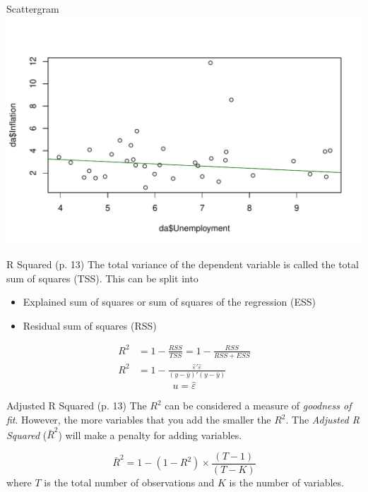 \documentclass[14pt,xcolor=pdftex,dvipsnames,table]{beamer}\usepackage[]{graphicx}\usepackage[]{color}
\makeatletter
\def\maxwidth{ %
  \ifdim\Gin@nat@width>\linewidth
    \linewidth
  \else
    \Gin@nat@width
  \fi
}
\newenvironment{knitrout}{}{} %
\makeatother
\begin{document}
\begin{frame}{Scattergram}
\begin{knitrout}
\color{fgcolor}
\includegraphics[width=\maxwidth]{figure/scatter-1} 

\end{knitrout}
\end{frame}


\begin{frame}{R Squared (p. 13)}
The total variance of the dependent variable is called the total sum of squares (TSS).  This can be split into 
\begin{itemize}[<+-| alert@+>]
\item Explained sum of squares or sum of squares of the regression (ESS)
\item Residual sum of squares (RSS)
\end{itemize}
\pause
\begin{align*}
R^2 &= 1 - \frac{RSS}{TSS} = 1 - \frac{RSS}{RSS + ESS}\\
R^2 &= 1 - \frac{\hat{\varepsilon}'\hat{\varepsilon}}{(y - \bar{y})'(y - \bar{y})}
\end{align*}
\begin{equation}
u = \hat{\varepsilon}
\end{equation}
\end{frame}

\begin{frame}{Adjusted R Squared (p. 13)}
The $R^2$ can be considered a measure of \emph{goodness of fit}.  However, the more variables that you add the smaller the $R^2$. The \emph{Adjusted R Squared} ($\bar{R}^2$) will make a penalty for adding variables. 

\begin{equation}
\bar{R}^2 = 1 - (1 - R^2) \times \frac{(T - 1)}{(T - K)}
\end{equation}
where $T$ is the total number of observations and $K$ is the number of variables. 
\end{frame}
\end{document}
